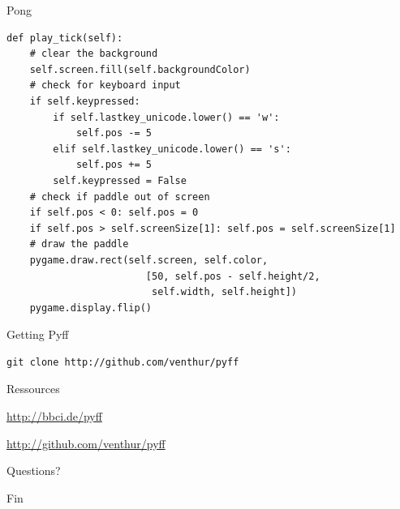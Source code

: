 \documentclass{beamer}
\begin{document}
\begin{frame}[fragile]{Pong}
    \begin{lstlisting}
def play_tick(self):
    # clear the background
    self.screen.fill(self.backgroundColor)
    # check for keyboard input
    if self.keypressed:
        if self.lastkey_unicode.lower() == 'w':
            self.pos -= 5
        elif self.lastkey_unicode.lower() == 's':
            self.pos += 5
        self.keypressed = False
    # check if paddle out of screen
    if self.pos < 0: self.pos = 0
    if self.pos > self.screenSize[1]: self.pos = self.screenSize[1]
    # draw the paddle
    pygame.draw.rect(self.screen, self.color,
                        [50, self.pos - self.height/2,
                         self.width, self.height])
    pygame.display.flip()
    \end{lstlisting}
\end{frame}


\begin{frame}[fragile]{Getting Pyff}
    \begin{lstlisting}[bash]
git clone http://github.com/venthur/pyff
    \end{lstlisting}
\end{frame}

\begin{frame}{Ressources}
    \begin{description}[xxxxxxxxxxxxxxx]
        \item[Pyff Homepage] \url{http://bbci.de/pyff}
        \item[git Repository] \url{http://github.com/venthur/pyff}
    \end{description}
\end{frame}

\begin{frame}[plain]
    \begin{center}
        \huge{Questions?}
    \end{center}
\end{frame}

\begin{frame}[plain]
    \begin{center}
        \huge{Fin}
    \end{center}
\end{frame}
\end{document}
